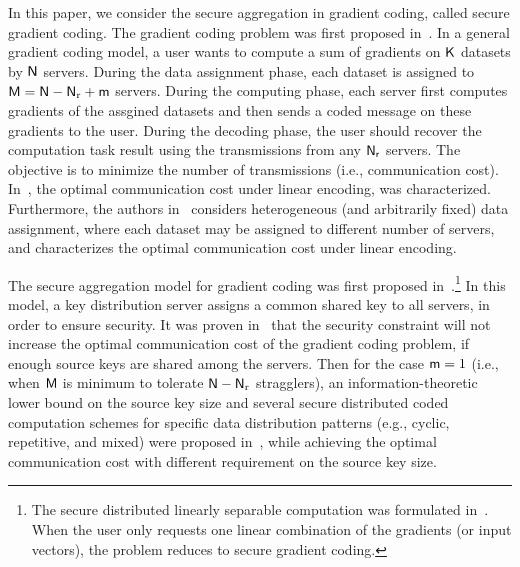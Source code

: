 \documentclass[conference,letterpaper]{IEEEtran}
\begin{document}
In this paper, we consider the secure aggregation in gradient coding, called secure gradient coding. 
The gradient coding problem was first proposed in~\cite{pmlr-v70-tandon17a}. 
In a general gradient coding model, a user wants to compute a sum of gradients on   ${\sf K}$ datasets by ${\sf N}$ servers. During the data assignment phase, each dataset is assigned to ${\sf M} = {\sf N} - {\sf N}_{\rm r} + {\sf m}$  servers.  During the computing phase, each server first computes gradients of the assgined datasets and then sends a coded message on these gradients to the user. During the decoding phase, the user should  recover the computation task result using the transmissions from any ${\sf N_r}$ servers. The objective is to minimize the number of transmissions (i.e., communication cost). 
In~\cite{ye2018communication}, the optimal communication cost under   linear encoding,  was characterized. 
Furthermore, the authors in~\cite{Heterogeneous_Gradient_Coding} considers  heterogeneous (and arbitrarily fixed) data assignment, where each dataset may be assigned to different number of servers,  and 
characterizes the  optimal communication cost  under   linear encoding. 

The secure aggregation model for gradient coding was first proposed in~\cite{wan2022secure}.\footnote{\label{foot:linearly separable}The secure distributed linearly separable computation was formulated in~\cite{wan2022secure}. When the user only requests one linear combination of the gradients (or input vectors),  the problem reduces to secure gradient coding.} %
In this model, a key distribution server assigns a common shared key to all servers, in order to ensure  security.
It was proven in~\cite{wan2022secure} that the security constraint will not increase the optimal
communication cost of the gradient coding problem, if enough
source keys are shared among the servers. Then 
for the case  ${\sf m}=1$ (i.e., when ${\sf M}$ is minimum to tolerate ${\sf N}-{\sf N}_{\rm r}$ stragglers), an information-theoretic lower bound on the source key size and  several secure distributed coded computation schemes for specific data distribution patterns (e.g., cyclic, repetitive, and mixed) were proposed in~\cite{wan2022secure},  while achieving the optimal communication cost with different requirement on the source key size. 
\end{document}
